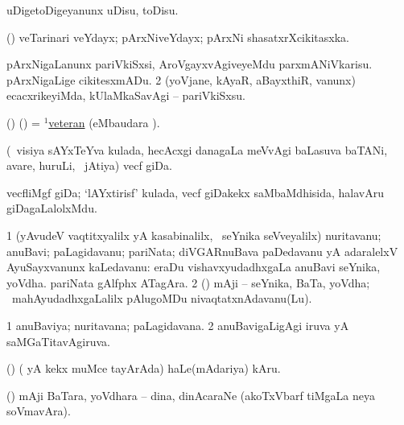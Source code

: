\bentry
{} 
\gl{\sakirx}
\expl{}
\bmng
 uDigetoDigeyanunx uDisu, toDisu. 
\emng
\eentry

\bentry
{} 
\gl{\nA}
\expl{}
\bmng
 (\AmA) veTarinari veYdayx; pArxNiveYdayx; pArxNi shasatxrXcikitasxka. 
\emng
\eentry

\bentry
{} 
\gl{\sakirx}
\bmng
\bnum
{} 
\banum
{} pArxNigaLanunx pariVkiSxsi, AroVgayxvAgiveyeMdu parxmANiVkarisu. 
 pArxNigaLige cikitesxmADu. 
\eanum
\numie
\num{2} (yoVjane, kAyaR, aBayxthiR, \mo vanunx) ecacxrikeyiMda, kUlaMkaSavAgi -- pariVkiSxsu. 
\enum
\emng
\eentry

\bentry
{} 
\gl{\nA}
\expl{}
\bmng
 (\ame) (\AmA) = \hyperlink{veteran(1)}{$^1$veteran} (eMbaudara \saMkiSx). 
\emng
\eentry

\bentry
{} 
\gl{\nA}
\expl{}
\bmng
 (\kanmu\ visiya sAYxTeYva kulada, hecAcxgi danagaLa meVvAgi baLasuva baTANi, avare, huruLi, \mo\ jAtiya) vecf giDa. 
\emng
\eentry

\bentry
{} 
\gl{\nA}
\expl{}
\bmng
 vecfliMgf giDa; `lAYxtirisf' kulada, vecf giDakekx saMbaMdhisida, halavAru giDagaLalolxMdu. 
\emng
\eentry

\bentry
{} 
\gl{\nA}
\expl{}
\bmng
\bnum
\num{1} (yAvudeV vaqtitxyalilx yA kasabinalilx, \kanmu\ seYnika seVveyalilx) nuritavanu; anuBavi; paLagidavanu; pariNata; diVGARnuBava paDedavanu yA adaralelxV AyuSayxvanunx kaLedavanu:  eraDu vishavxyudadhxgaLa anuBavi seYnika, yoVdha.  pariNata gAlfphx ATagAra. 
\num{2} (\ame) mAji -- seYnika, BaTa, yoVdha; \kanmu\ mahAyudadhxgaLalilx pAlugoMDu nivaqtatxnAdavanu(Lu). 
\enum
\emng
\eentry

\bentry
{} 
\gl{\gu}
\expl{}
\bmng
\bnum
\num{1} anuBaviya; nuritavana; paLagidavana. 
\num{2} anuBavigaLigAgi iruva yA saMGaTitavAgiruva. 
\enum
\emng
\eentry

\bentry
{}
\gl{\nA}
\expl{}
\bmng
 (\birx) ( yA kekx muMce tayArAda) haLe(mAdariya) kAru. 
\emng
\eentry

\bentry
{}
\gl{\nA}
\expl{}
\bmng
 (\ame) mAji BaTara, yoVdhara -- dina, dinAcaraNe (akoTxVbarf tiMgaLa neya soVmavAra). 
\emng
\eentry

